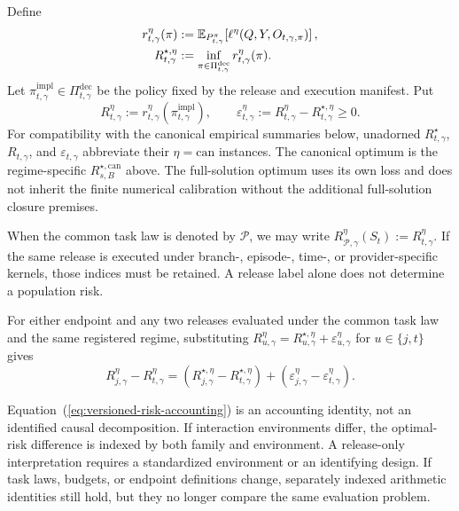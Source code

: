 \documentclass[10pt]{article} %
\renewcommand{\eqref}[1]{\textup{(\ref{#1})}}
\providecommand{\1}{\mathbf{1}}  %
\theoremstyle{remark}
\theoremstyle{definition}
\begin{document}
Define
\begin{align}
r_{t,\gamma}^{\eta}(\pi)
&:=
\mathbb E_{P_{t,\gamma}^{\pi}}\!
\left[\ell^\eta(Q,Y,O_{t,\gamma,\pi})\right],
\notag\\
R_{t,\gamma}^{\star,\eta}
&:=
\inf_{\pi\in\Pi_{t,\gamma}^{\mathrm{dec}}}
r_{t,\gamma}^{\eta}(\pi).
\label{eq:restricted-optimal-risk}
\end{align}
Let
$\pi_{t,\gamma}^{\mathrm{impl}}\in\Pi_{t,\gamma}^{\mathrm{dec}}$
be the policy fixed by the release and execution manifest. Put
\begin{equation}
R_{t,\gamma}^{\eta}
:=r_{t,\gamma}^{\eta}(\pi_{t,\gamma}^{\mathrm{impl}}),
\qquad
\varepsilon_{t,\gamma}^{\eta}
:=R_{t,\gamma}^{\eta}-R_{t,\gamma}^{\star,\eta}\geq0.
\label{eq:version-realization-gap}
\end{equation}
For compatibility with the canonical empirical summaries below,
unadorned $R_{t,\gamma}^{\star}$, $R_{t,\gamma}$, and
$\varepsilon_{t,\gamma}$ abbreviate their $\eta=\mathrm{can}$
instances. The canonical optimum is the regime-specific
$R_{s,B}^{\star,\mathrm{can}}$ above. The full-solution optimum uses
its own loss and does not inherit the finite numerical calibration
without the additional full-solution closure premises.

When the common task law is denoted by $\mathcal P$, we may write
$R_{\mathcal P,\gamma}^{\eta}(S_t):=R_{t,\gamma}^{\eta}$.
If the same release is executed under branch-, episode-, time-, or
provider-specific kernels, those indices must be retained. A release
label alone does not determine a population risk.

For either endpoint and any two releases evaluated under the common
task law and the same registered regime, substituting
$R_{u,\gamma}^{\eta}=R_{u,\gamma}^{\star,\eta}
+\varepsilon_{u,\gamma}^{\eta}$ for $u\in\{j,t\}$ gives
\begin{equation}
R_{j,\gamma}^{\eta}-R_{t,\gamma}^{\eta}
=
\left(R_{j,\gamma}^{\star,\eta}
-R_{t,\gamma}^{\star,\eta}\right)
+
\left(\varepsilon_{j,\gamma}^{\eta}
-\varepsilon_{t,\gamma}^{\eta}\right).
\label{eq:versioned-risk-accounting}
\end{equation}

Equation~\eqref{eq:versioned-risk-accounting} is an accounting identity,
not an identified causal decomposition. If interaction environments
differ, the optimal-risk difference is indexed by both family and
environment. A release-only interpretation requires a standardized
environment or an identifying design. If task laws, budgets, or
endpoint definitions change, separately indexed arithmetic identities
still hold, but they no longer compare the same evaluation problem.
\end{document}
